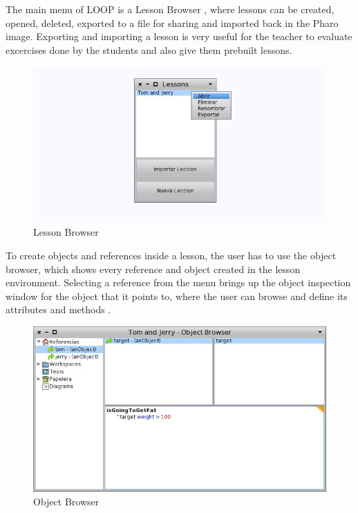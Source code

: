 \documentclass{sigplanconf}
\begin{document}
The main menu of LOOP is a Lesson Browser , where lessons can be created, opened, deleted, exported to a file for sharing and imported back in the Pharo image. Exporting and importing a lesson is very useful for the teacher to evaluate excercises done by the students and also give them prebuilt lessons.
\begin{figure}[h]
 \centering
 \includegraphics[scale=.35]{./images/lessonBrowser.png}
 \caption{Lesson Browser}
 \label{fig:lessonBrowser}
\end{figure}

To create objects and references inside a lesson, the user has to use the object browser, which shows every reference and object created in the lesson environment. Selecting a reference from the menu brings up the object inspection window for the object that it points to, where the user can browse and define its attributes and methods . 
\begin{figure}[h]
 \centering
 \includegraphics[scale=.35]{./images/objectBrowser.png}
 \caption{Object Browser}
 \label{fig:objectBrowser}
\end{figure}
\end{document}
